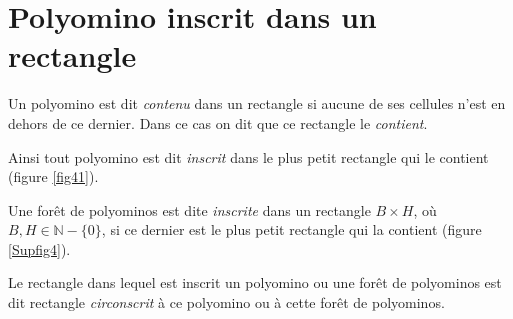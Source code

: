 \section{Polyomino inscrit dans un rectangle}
 Un polyomino est dit \emph{contenu}  dans un rectangle si aucune de ses cellules n'est en dehors de ce dernier.  Dans ce cas on dit que ce rectangle le \emph{contient}. 

  Ainsi tout polyomino est dit \emph{inscrit} dans le plus petit rectangle qui le contient (figure \ref{fig41}).


 Une forêt de polyominos est dite \emph{inscrite} dans un rectangle $B\times H$, où $B, H\in \mathbb{N}-\{0\}$, si ce dernier est le plus petit rectangle qui la contient (figure \ref{Supfig4}).


 Le rectangle dans lequel est inscrit un polyomino ou une forêt de polyominos est dit rectangle \emph{circonscrit} à ce polyomino ou à cette forêt de polyominos.

